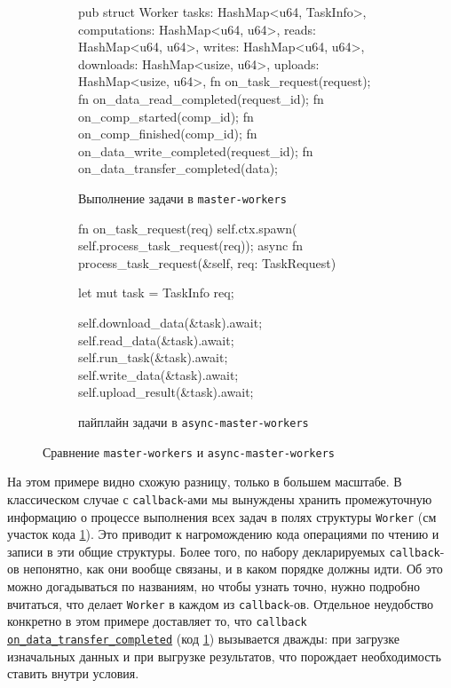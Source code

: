 \begin{figure}[H]
    \hspace{-0.55cm}
    \centering
    \begin{subfigure}[b]{0.537\linewidth}
        \footnotesize
        \centering
        \begin{rustcode}
pub struct Worker {
  tasks: HashMap<u64, TaskInfo>,
  computations: HashMap<u64, u64>,
  reads: HashMap<u64, u64>,
  writes: HashMap<u64, u64>,
  downloads: HashMap<usize, u64>,
  uploads: HashMap<usize, u64>,
}
fn on_task_request(request);
fn on_data_read_completed(request_id);
fn on_comp_started(comp_id);
fn on_comp_finished(comp_id);
fn on_data_write_completed(request_id);
fn on_data_transfer_completed(data);
    \end{rustcode}
        \caption{Выполнение задачи в \texttt{master-workers}}
        \label{master-workers}
    \end{subfigure}
    \hfill
    \begin{subfigure}[b]{0.48\linewidth}
        \footnotesize
        \centering
        \begin{rustcode}
fn on_task_request(req) {
  self.ctx.spawn(
    self.process_task_request(req));
}
async fn process_task_request(&self, req: TaskRequest) {
  let mut task = TaskInfo {req};

  self.download_data(&task).await;
  self.read_data(&task).await;
  self.run_task(&task).await;
  self.write_data(&task).await;
  self.upload_result(&task).await;
}
    \end{rustcode}
    \caption{пайплайн задачи в \texttt{async-master-workers}}
    \label{async-master-workers}
\end{subfigure}
\caption{Сравнение \texttt{master-workers} и \texttt{async-master-workers}}
\label{master-workers-comparison}
\end{figure}

На этом примере видно схожую разницу, только в большем масштабе. В классическом случае с \texttt{callback}-ами мы вынуждены хранить промежуточную информацию о процессе выполнения всех задач в полях структуры \texttt{Worker} (см участок кода \ref{master-workers}). Это приводит к нагромождению кода операциями по чтению и записи в эти общие структуры. Более того, по набору декларируемых \texttt{callback}-ов непонятно, как они вообще связаны, и в каком порядке должны идти. Об это можно догадываться по названиям, но чтобы узнать точно, нужно подробно вчитаться, что делает \texttt{Worker} в каждом из \texttt{callback}-ов. Отдельное неудобство конкретно в этом примере доставляет то, что \texttt{callback} \texttt{\underline{on\_data\_transfer\_completed}} (код \ref{master-workers}) вызывается дважды: при загрузке изначальных данных и при выгрузке результатов, что порождает необходимость ставить внутри условия.  

